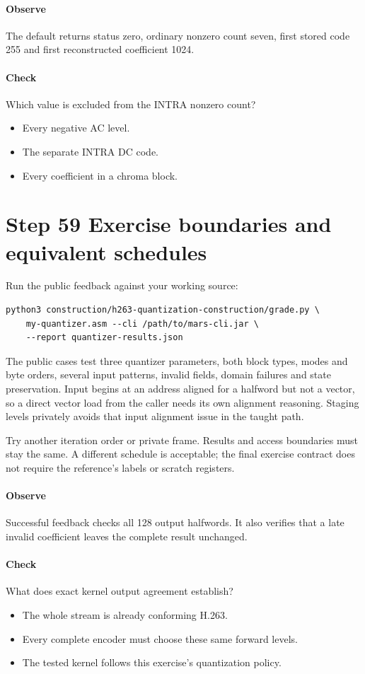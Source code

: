 \paragraph{Observe} The default returns status zero, ordinary nonzero count
seven, first stored code 255 and first reconstructed coefficient 1024.
\paragraph{Check} Which value is excluded from the INTRA nonzero count?
\begin{itemize}
  \item[A.] Every negative AC level.
  \item[B.] The separate INTRA DC code.
  \item[C.] Every coefficient in a chroma block.
\end{itemize}

\section{Step 59 Exercise boundaries and equivalent schedules}\label{h263-quant-s09}
Run the public feedback against your working source:
\begin{verbatim}
python3 construction/h263-quantization-construction/grade.py \
    my-quantizer.asm --cli /path/to/mars-cli.jar \
    --report quantizer-results.json
\end{verbatim}
The public cases test three quantizer parameters, both block types, modes and
byte orders, several input patterns, invalid fields, domain failures and state
preservation. Input begins at an address aligned for a halfword but not a vector,
so a direct vector load from the caller needs its own alignment reasoning.
Staging levels privately avoids that input alignment issue in the taught path.

Try another iteration order or private frame. Results and access boundaries
must stay the same. A different schedule is acceptable; the final exercise
contract does not require the reference's labels or scratch registers.

\paragraph{Observe} Successful feedback checks all 128 output halfwords. It
also verifies that a late invalid coefficient leaves the complete result unchanged.
\Needspace{8\baselineskip}
\paragraph{Check} What does exact kernel output agreement establish?
\begin{itemize}
  \item[A.] The whole stream is already conforming H.263.
  \item[B.] Every complete encoder must choose these same forward levels.
  \item[C.] The tested kernel follows this exercise's quantization policy.
\end{itemize}

